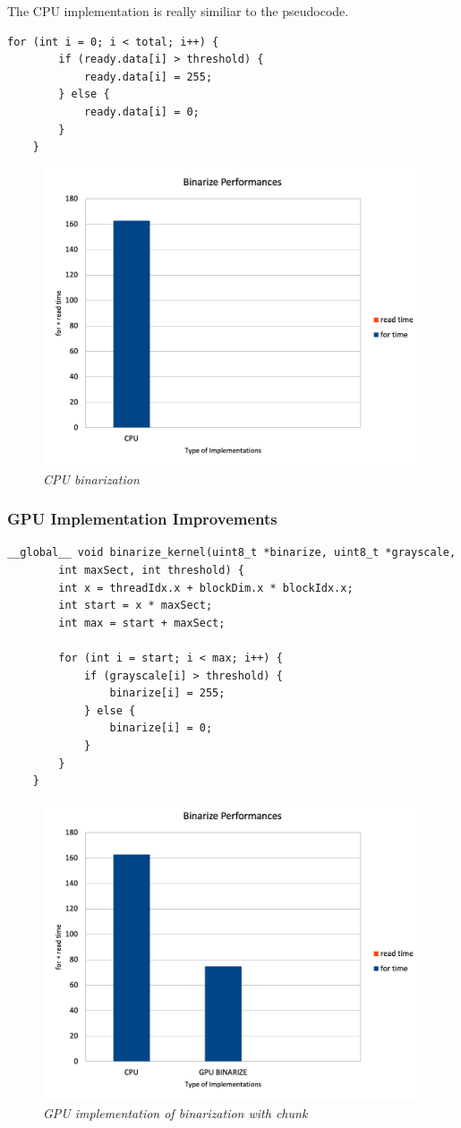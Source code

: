 \documentclass[paper=a4, fontsize=10pt]{scrartcl}	%
\begin{document}
	The CPU implementation is really similiar to the pseudocode.

	\begin{lstlisting}[style=CStyle]
	for (int i = 0; i < total; i++) {
		if (ready.data[i] > threshold) {
			ready.data[i] = 255;
		} else {
			ready.data[i] = 0;
		}
	}
	\end{lstlisting}


	\begin{figure}[H]
		\centering
		\includegraphics[width=0.75\linewidth]{images/binarization/bin1.png}
		\caption{\textit{CPU binarization}}
		\label{fig:cpu-bin}
	\end{figure}

	
	\subsubsection{GPU Implementation Improvements}
	
	\begin{lstlisting}[style=CStyle]
	__global__ void binarize_kernel(uint8_t *binarize, uint8_t *grayscale, 
		int maxSect, int threshold) {
		int x = threadIdx.x + blockDim.x * blockIdx.x;
		int start = x * maxSect;
		int max = start + maxSect;
	
		for (int i = start; i < max; i++) {
			if (grayscale[i] > threshold) {
				binarize[i] = 255;
			} else {
				binarize[i] = 0;
			}
		}
	}
	\end{lstlisting}

	\begin{figure}[H]
		\centering
		\includegraphics[width=0.75\linewidth]{images/binarization/bin2.png}
		\caption{\textit{GPU implementation of binarization with chunk}}
		\label{fig:gpu-bin}
	\end{figure}
	
\end{document}
